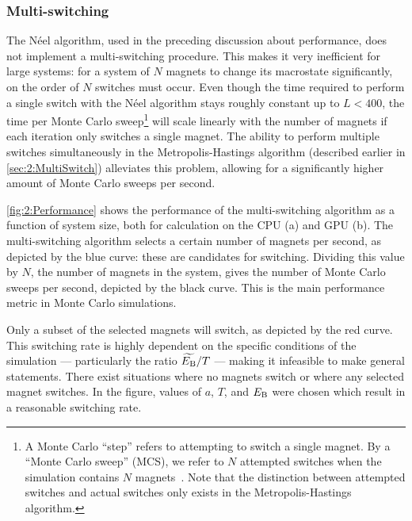 \subsubsection{Multi-switching}
The N\'eel algorithm, used in the preceding discussion about performance, does not implement a multi-switching procedure.
This makes it very inefficient for large systems: for a system of $N$ magnets to change its macrostate significantly, on the order of $N$ switches must occur.
Even though the time required to perform a single switch with the N\'eel algorithm stays roughly constant up to $L<400$, the time per Monte Carlo sweep\footnote{
	A Monte Carlo ``step'' refers to attempting to switch a single magnet. By a ``Monte Carlo sweep'' (MCS), we refer to $N$ attempted switches when the simulation contains $N$ magnets~\cite{NumericalDynamicalNiedermayer}. Note that the distinction between attempted switches and actual switches only exists in the Metropolis-Hastings algorithm. %
} will scale linearly with the number of magnets if each iteration only switches a single magnet.
The ability to perform multiple switches simultaneously in the Metropolis-Hastings algorithm (described earlier in \cref{sec:2:MultiSwitch}) alleviates this problem, allowing for a significantly higher amount of Monte Carlo sweeps per second. \\\par
\cref{fig:2:Performance} shows the performance of the multi-switching algorithm as a function of system size, both for calculation on the CPU (a) and GPU (b).
The multi-switching algorithm selects a certain number of magnets per second, as depicted by the blue curve: these are candidates for switching.
Dividing this value by $N$, the number of magnets in the system, gives the number of Monte Carlo sweeps per second, depicted by the black curve.
This is the main performance metric in Monte Carlo simulations. \par
Only a subset of the selected magnets will switch, as depicted by the red curve.
This switching rate is highly dependent on the specific conditions of the simulation --- particularly the ratio $\widetilde{E_\mathrm{B}}/T$ --- making it infeasible to make general statements.
There exist situations where no magnets switch or where any selected magnet switches.
In the figure, values of $a$, $T$, and $E_\mathrm{B}$ were chosen which result in a reasonable switching rate.


